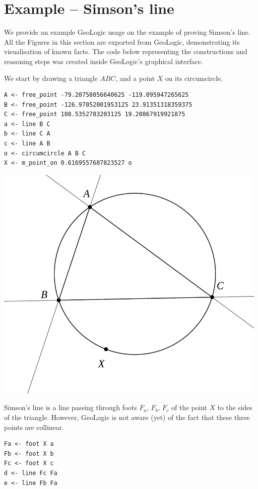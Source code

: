 \documentclass[runningheads]{llncs}
\begin{document}
\section{Example -- Simson's line}

We provide an example GeoLogic usage on the example of proving Simson's line.
All the Figures in this section are exported from GeoLogic,
demonstrating its visualisation of known facts. The code below
representing the constructions and reasoning steps was created inside
GeoLogic's graphical interface.

We start by drawing a triangle $ABC$, and a point $X$ on its
circumcircle.
\begin{verbatim}
A <- free_point -79.20758056640625 -119.095947265625
B <- free_point -126.97052001953125 23.91351318359375
C <- free_point 108.5352783203125 19.20867919921875
a <- line B C
b <- line C A
c <- line A B
o <- circumcircle A B C
X <- m_point_on 0.6169557687823527 o
\end{verbatim}

\newdimen\imgwidth
\imgwidth=5cm
\centerline{%
  \includegraphics[width = \imgwidth]{simson1.pdf}%
}

Simson's line is a line passing through foots $F_a$, $F_b$, $F_c$ of
the point $X$ to the sides of the triangle. However, GeoLogic is not
aware (yet) of the fact that these three points are collinear.

\begin{verbatim}
Fa <- foot X a
Fb <- foot X b
Fc <- foot X c
d <- line Fc Fa
e <- line Fb Fa
\end{verbatim}
\end{document}

